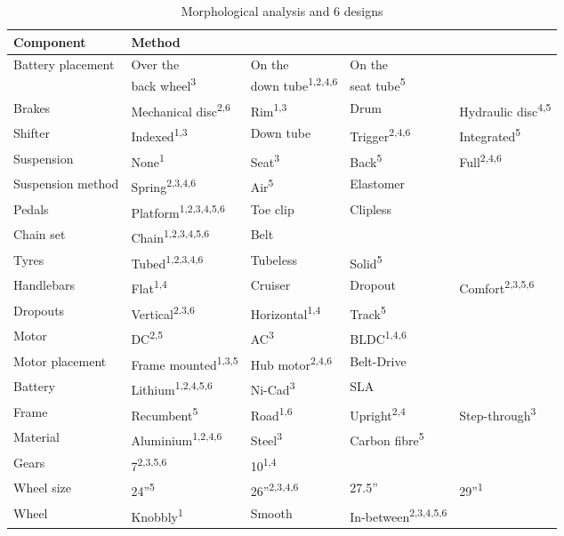 \begin{table}[!ht]
	\centering
	\caption{Morphological analysis and 6 designs}
	\renewcommand*{\arraystretch}{1.5}
	\begin{tabular}{l l l l l}
		\hline
		Component&Method&&&\\\hline
		Battery placement&\makecell[l]{Over the\\back wheel\textsuperscript{3}}&\makecell[l]{On the \\down tube\textsuperscript{1,2,4,6}}&\makecell[l]{On the \\seat tube\textsuperscript{5}}&\\\hline
		Brakes&Mechanical disc\textsuperscript{2,6}&Rim\textsuperscript{1,3}&Drum&Hydraulic disc\textsuperscript{4,5}\\\hline
		Shifter&Indexed\textsuperscript{1,3}&Down tube&Trigger\textsuperscript{2,4,6}&Integrated\textsuperscript{5}\\\hline
		Suspension&None\textsuperscript{1}&Seat\textsuperscript{3}&Back\textsuperscript{5}&Full\textsuperscript{2,4,6}\\\hline
		Suspension method&Spring\textsuperscript{2,3,4,6}&Air\textsuperscript{5}&Elastomer\\\hline
		Pedals&Platform\textsuperscript{1,2,3,4,5,6}&Toe clip&Clipless\\\hline
		Chain set&Chain\textsuperscript{1,2,3,4,5,6}&Belt&&\\\hline
		Tyres&Tubed\textsuperscript{1,2,3,4,6}&Tubeless&Solid\textsuperscript{5}&\\\hline
		Handlebars&Flat\textsuperscript{1,4}&Cruiser&Dropout&Comfort\textsuperscript{2,3,5,6}\\\hline
		Dropouts&Vertical\textsuperscript{2,3,6}&Horizontal\textsuperscript{1,4}&Track\textsuperscript{5}&\\\hline
		Motor&DC\textsuperscript{2,5}&AC\textsuperscript{3}&BLDC\textsuperscript{1,4,6}&\\\hline
		Motor placement&Frame mounted\textsuperscript{1,3,5}&Hub motor\textsuperscript{2,4,6}&Belt-Drive&\\\hline
		Battery&Lithium\textsuperscript{1,2,4,5,6}&Ni-Cad\textsuperscript{3}&SLA&\\\hline
		Frame&Recumbent\textsuperscript{5}&Road\textsuperscript{1,6}&Upright\textsuperscript{2,4}&Step-through\textsuperscript{3}\\\hline
		Material&Aluminium\textsuperscript{1,2,4,6}&Steel\textsuperscript{3}&Carbon fibre\textsuperscript{5}&\\\hline
		Gears&7\textsuperscript{2,3,5,6}&10\textsuperscript{1,4}&&\\\hline
		Wheel size&24''\textsuperscript{5}&26''\textsuperscript{2,3,4,6}&27.5''&29''\textsuperscript{1}\\\hline
		Wheel&Knobbly\textsuperscript{1}&Smooth&In-between\textsuperscript{2,3,4,5,6}&\\
	\end{tabular}
\end{table}
